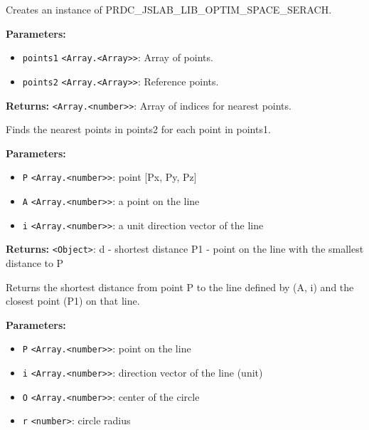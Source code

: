 \documentclass[12pt,a4paper]{article}
\begin{document}
\noindent Creates an instance of PRDC\_JSLAB\_LIB\_OPTIM\_SPACE\_SERACH.

\vspace{5mm}
\noindent {}


\noindent \textbf{Parameters:}
\begin{itemize}
  \item \texttt{points1} \texttt{<Array.<Array>>}: Array of points.
  \item \texttt{points2} \texttt{<Array.<Array>>}: Reference points.
\end{itemize}

\noindent \textbf{Returns:} \texttt{<Array.<number>>}: Array of indices for nearest points.

\noindent Finds the nearest points in points2 for each point in points1.

\vspace{5mm}
\noindent {}


\noindent \textbf{Parameters:}
\begin{itemize}
  \item \texttt{P} \texttt{<Array.<number>>}: point [Px, Py, Pz]
  \item \texttt{A} \texttt{<Array.<number>>}: a point on the line
  \item \texttt{i} \texttt{<Array.<number>>}: a unit direction vector of the line
\end{itemize}

\noindent \textbf{Returns:} \texttt{<Object>}: d   - shortest distance
  P1  - point on the line with the smallest distance to P

\noindent Returns the shortest distance from point P to the line defined by (A, i)
and the closest point (P1) on that line.

\vspace{5mm}
\noindent {}


\noindent \textbf{Parameters:}
\begin{itemize}
  \item \texttt{P} \texttt{<Array.<number>>}: point on the line
  \item \texttt{i} \texttt{<Array.<number>>}: direction vector of the line (unit)
  \item \texttt{O} \texttt{<Array.<number>>}: center of the circle
  \item \texttt{r} \texttt{<number>}: circle radius
\end{itemize}
\end{document}
